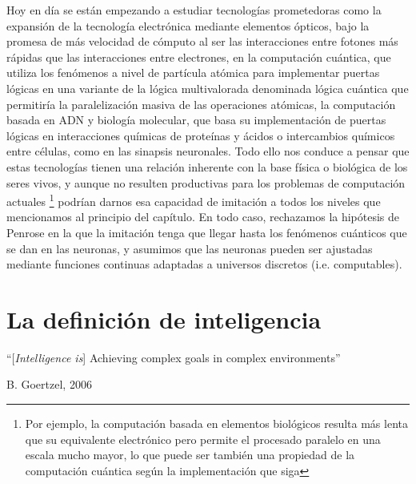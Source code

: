 \documentclass[12pt]{memoir}
\begin{document}
Hoy en día se están empezando a estudiar tecnologías prometedoras como la expansión de la tecnología electrónica mediante elementos ópticos, bajo la promesa de más velocidad de cómputo al ser las interacciones entre fotones más rápidas que las interacciones entre electrones, en la computación cuántica, que utiliza los fenómenos a nivel de partícula atómica para implementar puertas lógicas en una variante de la lógica multivalorada denominada lógica cuántica que permitiría la paralelización masiva de las operaciones atómicas, la computación basada en ADN y biología molecular, que basa su implementación de puertas lógicas en interacciones químicas de proteínas y ácidos o intercambios químicos entre células, como en las sinapsis neuronales. Todo ello nos conduce a pensar que estas tecnologías tienen una relación inherente con la base física o biológica de los seres vivos, y aunque no resulten productivas para los problemas de computación actuales \footnote{Por ejemplo, la computación basada en elementos biológicos resulta más lenta que su equivalente electrónico pero permite el procesado paralelo en una escala mucho mayor, lo que puede ser también una propiedad de la computación cuántica según la implementación que siga} podrían darnos esa capacidad de imitación a todos los niveles que mencionamos al principio del capítulo. En todo caso, rechazamos la hipótesis de Penrose en la que la imitación tenga que llegar hasta los fenómenos cuánticos que se dan en las neuronas, y asumimos que las neuronas pueden ser ajustadas mediante funciones continuas adaptadas a universos discretos (i.e. computables).

\chapter{La definición de inteligencia}

\epigraph{``[\textit{Intelligence is}] Achieving complex goals in complex environments''}{B. Goertzel, 2006}
\end{document}
